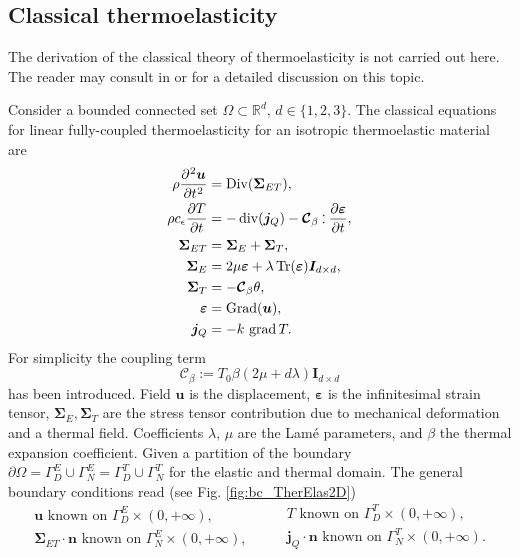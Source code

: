 \subsection{Classical thermoelasticity}
The derivation of the classical theory of thermoelasticity is not carried out here. The reader may consult in \cite[Chapter 1]{hetnarski2009thermal} or \cite[Chapter 8]{abeyaratne2012notes} for a detailed discussion on this topic. 

Consider a bounded connected set $\Omega \subset \mathbb{R}^d, \, d \in \{1,2,3\}$. The classical equations for linear fully-coupled thermoelasticity for an isotropic thermoelastic material are \cite{biot1956thermoelasticity,carlson1973}
\begin{equation}\label{eq:sysThElas}
\begin{aligned}
\displaystyle \rho \diffp[2]{\bm{u}}{t} &= \Div(\bm{\Sigma}_{ET}) , \\
\displaystyle \rho c_\epsilon \diffp{T}{t} &= -\div(\bm{j}_Q) - \bm{\mathcal{C}}_\beta \cddot \displaystyle\diffp{\bm{\varepsilon}}{t}, \\
\bm{\Sigma}_{ET} &= \bm{\Sigma}_E + \bm{\Sigma}_{T}, \\
\bm{\Sigma}_E &= 2\mu \bm{\varepsilon} + \lambda \Tr(\bm{\varepsilon}) \bm{I}_{d\times d}, \\
\bm{\Sigma}_T &= - \bm{\mathcal{C}}_\beta \theta,  \\
\bm{\varepsilon} &= \Grad(\bm{u}), \\
\bm{j}_Q &= -k \, \grad T.
\end{aligned}
\end{equation}
For simplicity  the coupling term
\[\bm{\mathcal{C}}_\beta:=T_0 \beta(2\mu + d \lambda)\bm{I}_{d\times d} \]
has been introduced. Field $\bm{u}$ is the displacement, $\bm{\varepsilon}$ is the infinitesimal strain tensor, $\bm{\Sigma}_E, \bm{\Sigma}_T$ are the stress tensor contribution due to mechanical deformation and a thermal field. Coefficients $\lambda,\, \mu$ are the Lam\'e parameters,  and $\beta$ the thermal expansion coefficient. Given a partition of the boundary $\partial \Omega = \Gamma_D^E \cup \Gamma_N^E = \Gamma_D^T \cup \Gamma_N^T$ for the elastic and thermal domain. The general boundary conditions read (see Fig. \ref{fig:bc_TherElas2D})
\begin{equation}
\begin{aligned}
\bm{u} \text{ known on } \Gamma_D^E \times (0, +\infty), \\
\bm{\Sigma}_{ET} \cdot \bm{n} \text{ known on } \Gamma_N^E \times (0, +\infty), 
\end{aligned} \qquad
\begin{aligned}
T \text{ known on } \Gamma_D^T \times (0, +\infty), \\
\bm{j}_Q \cdot \bm{n} \text{ known on } \Gamma_N^T \times (0, +\infty).
\end{aligned}
\end{equation}
